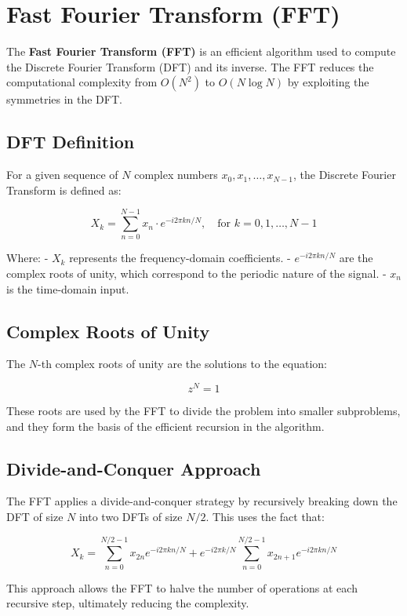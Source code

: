 \documentclass{article}
\begin{document}
\section{Fast Fourier Transform (FFT)}

The \textbf{Fast Fourier Transform (FFT)} is an efficient algorithm used to compute the Discrete Fourier Transform (DFT) and its inverse. The FFT reduces the computational complexity from \(O(N^2)\) to \(O(N \log N)\) by exploiting the symmetries in the DFT.

\subsection{DFT Definition}

For a given sequence of \(N\) complex numbers \(x_0, x_1, \dots, x_{N-1}\), the Discrete Fourier Transform is defined as:

\[
X_k = \sum_{n=0}^{N-1} x_n \cdot e^{-i 2 \pi k n / N}, \quad \text{for } k = 0, 1, \dots, N-1
\]

Where:
- \( X_k \) represents the frequency-domain coefficients.
- \( e^{-i 2 \pi k n / N} \) are the complex roots of unity, which correspond to the periodic nature of the signal.
- \( x_n \) is the time-domain input.

\subsection{Complex Roots of Unity}

The \(N\)-th complex roots of unity are the solutions to the equation:

\[
z^N = 1
\]

These roots are used by the FFT to divide the problem into smaller subproblems, and they form the basis of the efficient recursion in the algorithm.

\subsection{Divide-and-Conquer Approach}

The FFT applies a divide-and-conquer strategy by recursively breaking down the DFT of size \(N\) into two DFTs of size \(N/2\). This uses the fact that:

\[
X_k = \sum_{n=0}^{N/2-1} x_{2n} e^{-i 2 \pi k n / N} + e^{-i 2 \pi k / N} \sum_{n=0}^{N/2-1} x_{2n+1} e^{-i 2 \pi k n / N}
\]

This approach allows the FFT to halve the number of operations at each recursive step, ultimately reducing the complexity.
\end{document}
